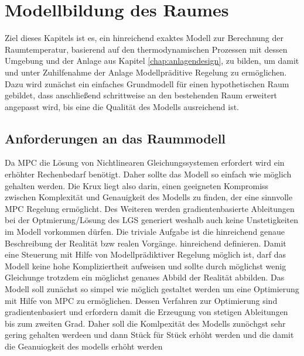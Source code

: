 %
%

\renewcommand{\chapterheadstartvskip}{\vspace*{2cm}}

\chapter{Modellbildung des Raumes}
\label{chap:modellbildung}

Ziel dieses Kapitels ist es, ein hinreichend exaktes Modell zur Berechnung der Raumtemperatur, basierend auf den thermodynamischen Prozessen mit dessen Umgebung und der Anlage aus Kapitel \ref{chap:anlagendesign}, zu bilden, um damit und unter Zuhilfenahme der Anlage Modellpräditive Regelung zu ermöglichen.
Dazu wird zunächst ein einfaches Grundmodell für einen hypothetischen Raum gebildet, dass anschließend schrittweise an den bestehenden Raum erweitert angepasst wird, bis eine die Qualität des Modells ausreichend ist.

\section{Anforderungen an das Raummodell}
Da MPC die Lösung von Nichtlinearen Gleichungssystemen erfordert wird ein erhöhter Rechenbedarf benötigt. Daher sollte das Modell so einfach wie möglich gehalten werden. Die Krux liegt also darin, einen geeigneten Kompromiss zwischen Komplexität und Genauigkeit des Modells zu finden, der eine sinnvolle MPC Regelung ermöglicht.
Des Weiteren werden gradientenbasierte Ableitungen bei der Optmierung/Lösung des LGS generiert weshalb auch keine Unstetigkeiten im Modell vorkommen dürfen.
Die triviale Aufgabe ist die hinreichend genaue Beschreibung der Realität bzw realen Vorgänge. hinreichend definieren.
Damit eine Steuerung mit Hilfe von Modellprädiktiver Regelung möglich ist, darf das Modell keine hohe Kompliziertheit aufweisen und sollte durch möglichst wenig Gleichunge trotzdem ein möglichst genaues Abbild der Realität abbilden.
Das Modell soll zunächst so simpel wie möglich gestaltet werden um eine Optimierung mit Hilfe von MPC zu ermöglichen. Dessen Verfahren zur Optimierung sind gradientenbasiert und erfordern damit die Erzeugung von stetigen Ableitungen bis zum zweiten Grad. Daher soll die Komlpexität des Modells zunöchgst sehr gering gehalten werdeen und dann Stück für Stück erhöht werden und die damit die Geanuiogkeit des modells erhöht werden

